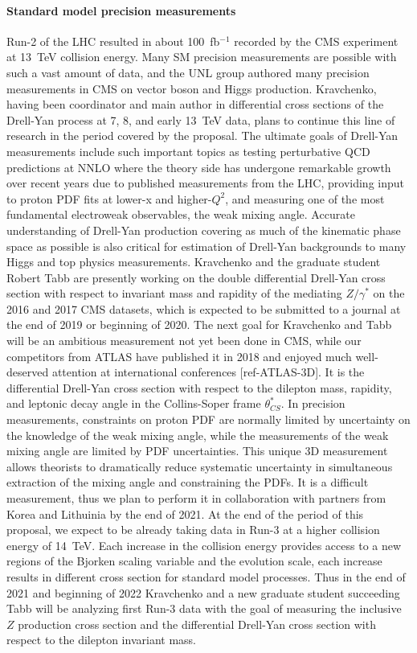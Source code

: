 \paragraph{Standard model precision measurements}
Run-2 of the LHC resulted in about 100~fb$^{-1}$ recorded by the CMS experiment at 13~TeV collision energy. Many SM precision measurements are possible with such a vast amount of data, and the UNL group authored many precision measurements in CMS on vector boson and Higgs production. Kravchenko, having been coordinator and main author in differential cross sections of the Drell-Yan process at 7, 8, and early 13~TeV data, plans to continue this line of research in the period covered by the proposal. The ultimate goals of Drell-Yan measurements include such important topics as testing perturbative QCD predictions at NNLO where the theory side has undergone remarkable growth over recent years due to published measurements from the LHC, providing input to proton PDF fits at lower-x and higher-$Q^2$, and measuring one of the most fundamental electroweak observables, the weak mixing angle. Accurate understanding of Drell-Yan production covering as much of the kinematic phase space as possible is also critical for estimation of Drell-Yan backgrounds to many Higgs and top physics measurements. Kravchenko and the graduate student Robert Tabb are presently working on the double differential Drell-Yan cross section with respect to invariant mass and rapidity of the mediating $Z/\gamma^*$ on the 2016 and 2017 CMS datasets, which is expected to be submitted to a journal at the end of 2019 or beginning of 2020. The next goal for Kravchenko and Tabb will be an ambitious measurement not yet been done in CMS, while our competitors from ATLAS have published it in 2018 and enjoyed much well-deserved attention at international conferences [ref-ATLAS-3D]. It is the differential Drell-Yan cross section with respect to the dilepton mass, rapidity, and leptonic decay angle in the Collins-Soper frame $\theta^*_{CS}$. In precision measurements, constraints on proton PDF are normally limited by uncertainty on the knowledge of the weak mixing angle, while the measurements of the weak mixing angle are limited by PDF uncertainties. This unique 3D measurement allows theorists to dramatically reduce systematic uncertainty in simultaneous extraction of the mixing angle and constraining the PDFs. It is a difficult measurement, thus we plan to perform it in collaboration with partners from Korea and Lithuinia by the end of 2021. At the end of the period of this proposal, we expect to be already taking data in Run-3 at a higher collision energy of 14~TeV. Each increase in the collision energy provides access to a new regions of the Bjorken scaling variable and the evolution scale, each increase results in different cross section for standard model processes. Thus in the end of 2021 and beginning of 2022 Kravchenko and a new graduate student succeeding Tabb will be analyzing first Run-3 data with the goal of measuring the inclusive $Z$ production cross section and the differential Drell-Yan cross section with respect to the dilepton invariant mass.

